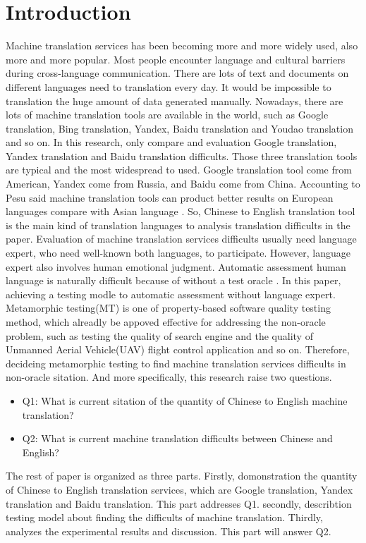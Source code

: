 \documentclass[conference]{IEEEtran}
\begin{document}
\section{Introduction}
Machine translation services has been becoming more and more widely used, also
more and more popular. Most people encounter language and cultural barriers
during cross-language communication. There are lots of text and documents on different languages need
to translation every day. It would be impossible to translation the huge amount
of data generated manually. Nowadays, there are lots of machine translation
tools are available in the world, such as Google translation, Bing translation,
Yandex, Baidu translation and Youdao translation and so on. In this research,
only compare and evaluation Google translation, Yandex translation and Baidu
translation difficults. Those three translation tools are typical and the most
widespread to used. Google translation tool come from American, Yandex come from
Russia, and Baidu come from China. Accounting to Pesu said machine translation
tools can product better results on European languages compare with Asian
language \cite{pesu2018monte}. So, Chinese to English translation tool is the main
kind of translation languages to analysis translation difficults in the paper.
Evaluation of machine translation services difficults usually need language
expert, who need well-known both languages, to participate. However, language
expert also involves human emotional judgment. Automatic assessment human
language is naturally difficult because of without a test oracle \cite{zhou2016metamorphic}.
In this paper, achieving a testing modle to automatic assessment
without language expert. Metamorphic testing(MT) is one of property-based
software quality testing method, which alreadly be appoved effective for
addressing the non-oracle problem, such as testing the quality of search engine
and the quality of Unmanned Aerial Vehicle(UAV) flight control application and so on.
Therefore, decideing metamorphic testing to find machine translation services
difficults in non-oracle sitation.
And more specifically, this research raise two questions.
\begin{itemize}
  \item Q1: What is current sitation of the quantity of Chinese to English
    machine translation?
  \item Q2: What is current machine translation difficults between Chinese and English?
\end{itemize}

The rest of paper is organized as three parts. Firstly, domonstration the
quantity of Chinese to English translation services, which are Google
translation, Yandex translation and Baidu translation. This part addresses Q1.
secondly, describtion testing model about finding the difficults of machine
translation.
Thirdly, analyzes the experimental results and discussion. This part will
answer Q2.
\end{document}
